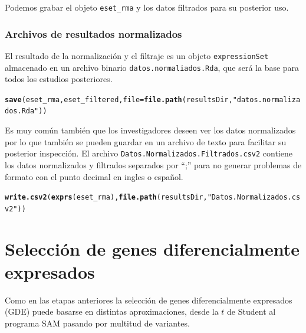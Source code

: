 \documentclass[a4paper]{article}\usepackage[]{graphicx}\usepackage[]{color}
\makeatletter
\newcommand{\hlstr}[1]{\textcolor[rgb]{0.192,0.494,0.8}{#1}}%
\newcommand{\hlstd}[1]{\textcolor[rgb]{0.345,0.345,0.345}{#1}}%
\newcommand{\hlkwc}[1]{\textcolor[rgb]{0.333,0.667,0.333}{#1}}%
\newcommand{\hlkwd}[1]{\textcolor[rgb]{0.737,0.353,0.396}{\textbf{#1}}}%
\newenvironment{kframe}{%
 \def\at@end@of@kframe{}%
 \ifinner\ifhmode%
  \def\at@end@of@kframe{\end{minipage}}%
  \begin{minipage}{\columnwidth}%
 \fi\fi%
 \def\FrameCommand##1{\hskip\@totalleftmargin \hskip-\fboxsep
 \colorbox{shadecolor}{##1}\hskip-\fboxsep
     \hskip-\linewidth \hskip-\@totalleftmargin \hskip\columnwidth}%
 \MakeFramed {\advance\hsize-\width
   \@totalleftmargin\z@ \linewidth\hsize
   \@setminipage}}%
 {\par\unskip\endMakeFramed%
 \at@end@of@kframe}
\newenvironment{knitrout}{}{} %
\makeatother
\begin{document}
Podemos grabar el objeto \texttt{eset_rma} y los datos filtrados para su posterior uso.


\subsubsection{Archivos de resultados normalizados}

El resultado de la normalización y el filtraje es un objeto \texttt{expressionSet} almacenado en un archivo binario \texttt{datos.normaliados.Rda}, que será la base para todos los estudios posteriores.

\begin{knitrout}
\color{fgcolor}\begin{kframe}
\begin{alltt}
\hlkwd{save}\hlstd{(eset_rma, eset_filtered,} \hlkwc{file}\hlstd{=}\hlkwd{file.path}\hlstd{(resultsDir,} \hlstr{"datos.normalizados.Rda"}\hlstd{))}
\end{alltt}
\end{kframe}
\end{knitrout}


Es muy común también que los investigadores deseen ver los datos normalizados por lo que también se pueden guardar en un archivo de texto para facilitar su posterior inspección. El archivo \texttt{Datos.Normalizados.Filtrados.csv2} contiene los datos normalizados y filtrados separados por ``;'' para no generar problemas de formato con el punto decimal en ingles o español.

\begin{knitrout}
\color{fgcolor}\begin{kframe}
\begin{alltt}
\hlkwd{write.csv2}\hlstd{(}\hlkwd{exprs}\hlstd{(eset_rma),} \hlkwd{file.path}\hlstd{(resultsDir,} \hlstr{"Datos.Normalizados.csv2"}\hlstd{))}
\end{alltt}
\end{kframe}
\end{knitrout}


\section{Selección de genes diferencialmente expresados}

Como en las etapas anteriores la selección de genes diferencialmente expresados (GDE)
puede basarse en distintas aproximaciones, desde la $t$ de Student al programa SAM pasando por multitud de variantes.
\end{document}
